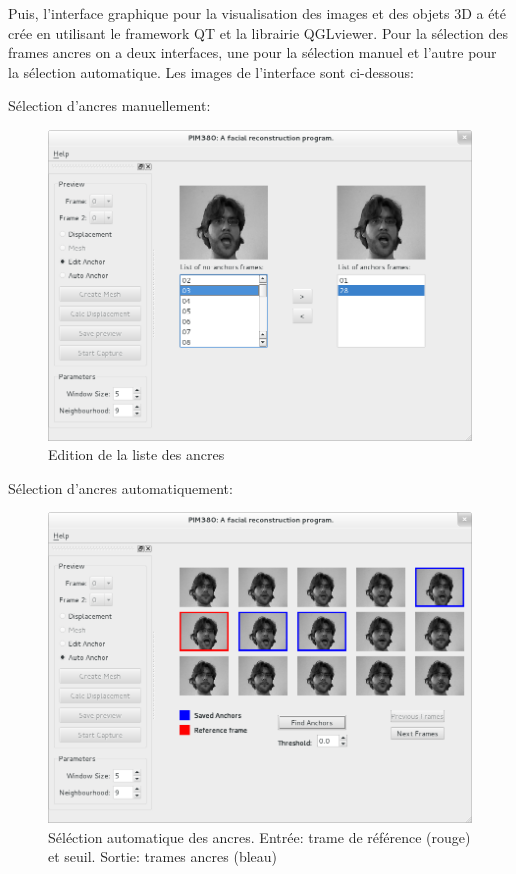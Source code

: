 \documentclass[a4paper,12pt]{article}
\begin{document}
Puis, l'interface graphique pour la visualisation des images et des
objets 3D a été crée en utilisant le framework QT et la librairie
QGLviewer. 
Pour la sélection des  frames ancres on a deux interfaces, une pour la
sélection manuel et l’autre pour la sélection automatique. Les images
de l’interface sont ci-dessous:

Sélection d'ancres manuellement: 

\begin{figure}[h!]
  \begin{center}
    \includegraphics[scale=0.4]{img/editAnchorList.png}
    \caption{Edition de la liste des ancres}
  \end{center}
\end{figure}

Sélection d'ancres automatiquement:

\begin{figure}[h!]
  \begin{center}
    \includegraphics[scale=0.4]{img/AnchorAutomaticSelection.png}
    \caption{Séléction automatique des ancres. Entrée: trame de référence (rouge) et seuil. Sortie: trames ancres (bleau)}
  \end{center}
\end{figure}
\end{document}
